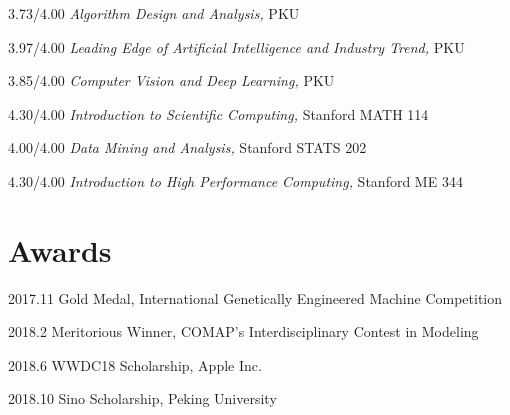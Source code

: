 \documentclass{academiccv}
\begin{document}
\begin{tablist}

\item[3.73/4.00] \tab \emph{Algorithm Design and Analysis}\emph, PKU
\item[3.97/4.00] \tab  \emph{Leading Edge of Artificial Intelligence and Industry Trend}\emph, PKU
\item[3.85/4.00] \tab \emph{Computer Vision and Deep Learning}\emph, PKU
\item[4.30/4.00] \tab \emph{Introduction to Scientific Computing}\emph, Stanford MATH 114

\item[4.00/4.00] \tab \emph{Data Mining and Analysis}\emph, Stanford STATS 202

\item[4.30/4.00] \tab \emph{Introduction to High Performance Computing}\emph, Stanford ME 344

\end{tablist}


\section*{Awards}

\begin{tablist}
	\item[2017.11] \tab Gold Medal, International Genetically Engineered Machine Competition

	\item[2018.2] \tab Meritorious Winner, COMAP's Interdisciplinary Contest in Modeling

	\item[2018.6] \tab WWDC18 Scholarship, Apple Inc.
	
	\item[2018.10] \tab Sino Scholarship, Peking University

	\end{tablist}
\end{document}
